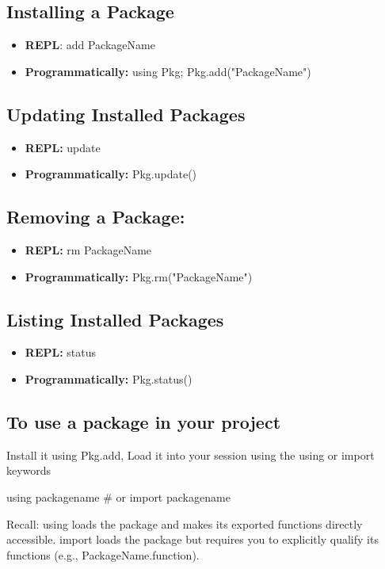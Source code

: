 \documentclass{report}
\begin{document}
     \subsection{Installing a Package}
     \bigbreak \noindent 
     \begin{itemize}
         \item \textbf{REPL}: add PackageName
         \item \textbf{Programmatically:} using Pkg; Pkg.add("PackageName")
     \end{itemize}
     \bigbreak \noindent 
     \subsection{Updating Installed Packages}
     \bigbreak \noindent 
     \begin{itemize}
         \item \textbf{REPL:} update
         \item \textbf{Programmatically:} Pkg.update()
     \end{itemize}
     \bigbreak \noindent 
     \subsection{Removing a Package:}
     \bigbreak \noindent 
     \begin{itemize}
         \item \textbf{REPL:} rm PackageName
         \item \textbf{Programmatically:} Pkg.rm("PackageName")
     \end{itemize}

     \bigbreak \noindent 
     \subsection{Listing Installed Packages}
     \bigbreak \noindent 
     \begin{itemize}
         \item \textbf{REPL:} status
         \item \textbf{Programmatically:} Pkg.status()
     \end{itemize}

     \bigbreak \noindent 
     \subsection{To use a package in your project}
     \bigbreak \noindent 
     Install it using Pkg.add, Load it into your session using the using or import keywords
     \bigbreak \noindent 
     \begin{jlcode}
         using packagename
         # or
         import packagename
     \end{jlcode}
     \bigbreak \noindent 
     Recall:
     using loads the package and makes its exported functions directly accessible. import loads the package but requires you to explicitly qualify its functions (e.g., PackageName.function).
\end{document}
